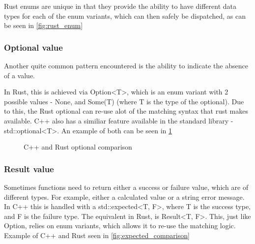 \documentclass[
    english, %
]{VUMIFPSkursinis}
\begin{document}

Rust enums are unique in that they provide the ability to have different data types for each of the enum variants, which can then safely be dispatched, as can be seen in \cref{fig:rust_enum}


\FloatBarrier
\subsubsection{Optional value}

Another quite common pattern encountered is the ability to indicate the absence of a value.

In Rust, this is achieved via Option<T>, which is an enum variant with 2 possible values - None, and Some(T) (where T is the type of the optional). Due to this, the Rust optional can re-use alot of the matching syntax that rust makes available. C++ also has a similiar feature available in the standard library - std::optional<T>. An example of both can be seen in \cref{fig:optional_comparison}

\begin{figure}[!htbp]
    \begin{minipage}{0.55\textwidth}
        \centering
    \end{minipage}
    \begin{minipage}{0.45\textwidth}
        \centering
    \end{minipage}
    \caption{C++ and Rust optional comparison}
    \label{fig:optional_comparison}
\end{figure}

\FloatBarrier
\subsubsection{Result value}

Sometimes functions need to return either a success or failure value, which are of different types. For example, either a calculated value or a string error message. In C++ this is handled with a std::expected<T, F>, where T is the success type, and F is the failure type. The equivalent in Rust, is Result<T, F>. This, just like Option, relies on enum variants, which allows it to re-use the matching logic. Example of C++ and Rust seen in \cref{fig:expected_comparison}
\end{document}
